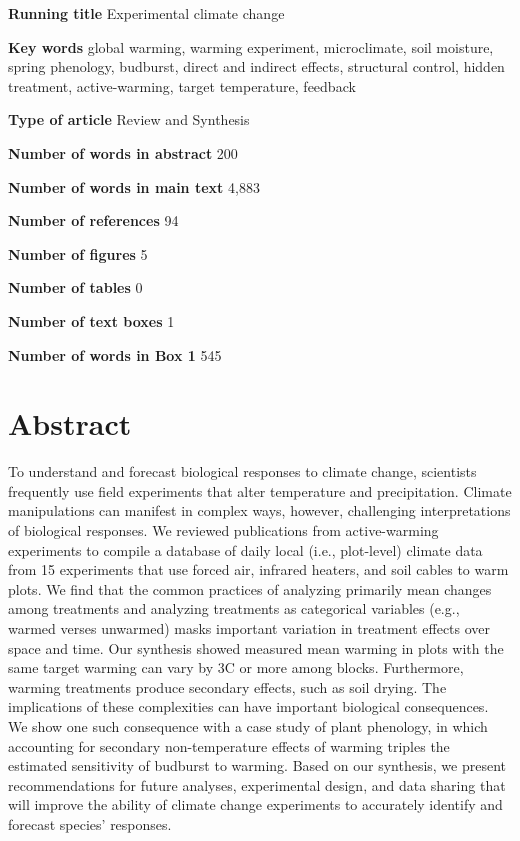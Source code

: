 \documentclass{article}
\begin{document}
\textbf{Running title} Experimental climate change

\textbf{Key words} global warming, warming experiment, microclimate, soil moisture, spring phenology, budburst, direct and indirect effects, structural control, hidden treatment, active-warming, target temperature, feedback

\textbf{Type of article} Review and Synthesis

\textbf{Number of words in abstract} 200

\textbf{Number of words in main text} 4,883%

\textbf{Number of references} 94

\textbf{Number of figures} 5

\textbf{Number of tables} 0

\textbf{Number of text boxes} 1

\textbf{Number of words in Box 1} 545

\clearpage

\clearpage
\linenumbers



\section*{Abstract}
\par To understand and forecast biological responses to climate change, scientists frequently use field experiments that alter temperature and precipitation. Climate manipulations can manifest in complex ways, however, challenging interpretations of biological responses. We reviewed publications from active-warming experiments to compile a database of daily local (i.e., plot-level) climate data from 15 experiments that use forced air, infrared heaters, and soil cables to warm plots. We find that the common practices of analyzing primarily mean changes among treatments and analyzing treatments as categorical variables (e.g., warmed verses unwarmed) masks important variation in treatment effects over space and time. Our synthesis showed measured mean warming in plots with the same target warming can vary by 3\degree C or more among blocks. Furthermore, warming treatments produce secondary effects, such as soil drying. The implications of these complexities can have important biological consequences. We show one such consequence with a case study of plant phenology, in which accounting for secondary non-temperature effects of warming triples the estimated sensitivity of budburst to warming. Based on our synthesis, we present recommendations for future analyses, experimental design, and data sharing that will improve the ability of climate change experiments to accurately identify and forecast species' responses.
\end{document}
